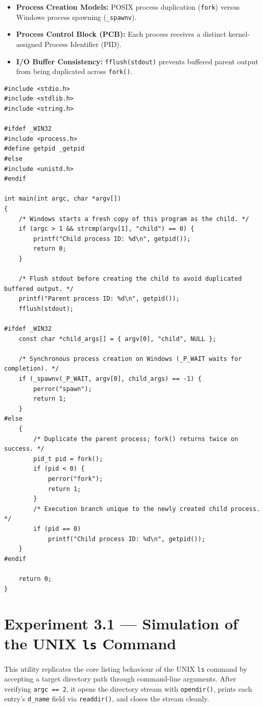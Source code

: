 \documentclass[11pt,a4paper]{article}
\newcommand{\exptheader}[3]{%
    \section[#1: #2]{#1 --- #2}%
    \label{#3}%
}
\begin{document}
\begin{itemize}
    \item \textbf{Process Creation Models:} POSIX process duplication (\texttt{fork}) versus Windows process spawning (\texttt{\_spawnv}).
    \item \textbf{Process Control Block (PCB):} Each process receives a distinct kernel-assigned Process Identifier (PID).
    \item \textbf{I/O Buffer Consistency:} \texttt{fflush(stdout)} prevents buffered parent output from being duplicated across \texttt{fork()}.
\end{itemize}

\begin{lstlisting}[title={\texttt{expt\_2\_2.c}}]
#include <stdio.h>
#include <stdlib.h>
#include <string.h>

#ifdef _WIN32
#include <process.h>
#define getpid _getpid
#else
#include <unistd.h>
#endif

int main(int argc, char *argv[])
{
    /* Windows starts a fresh copy of this program as the child. */
    if (argc > 1 && strcmp(argv[1], "child") == 0) {
        printf("Child process ID: %d\n", getpid());
        return 0;
    }

    /* Flush stdout before creating the child to avoid duplicated buffered output. */
    printf("Parent process ID: %d\n", getpid());
    fflush(stdout);

#ifdef _WIN32
    const char *child_args[] = { argv[0], "child", NULL };

    /* Synchronous process creation on Windows (_P_WAIT waits for completion). */
    if (_spawnv(_P_WAIT, argv[0], child_args) == -1) {
        perror("spawn");
        return 1;
    }
#else
    {
        /* Duplicate the parent process; fork() returns twice on success. */
        pid_t pid = fork();
        if (pid < 0) {
            perror("fork");
            return 1;
        }
        /* Execution branch unique to the newly created child process. */
        if (pid == 0)
            printf("Child process ID: %d\n", getpid());
    }
#endif

    return 0;
}
\end{lstlisting}

\exptheader{Experiment 3.1}{Simulation of the UNIX \texttt{ls} Command}{exp:3.1}

This utility replicates the core listing behaviour of the UNIX \texttt{ls} command by accepting a target directory path through command-line arguments. After verifying \texttt{argc == 2}, it opens the directory stream with \texttt{opendir()}, prints each entry's \texttt{d\_name} field via \texttt{readdir()}, and closes the stream cleanly.
\end{document}
